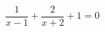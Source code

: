\begin{ex}[type=equation]
	\begin{condition}
		$\dfrac{1}{x - 1} + \dfrac{2}{x + 2} + 1 = 0$
	\end{condition}
\end{ex}